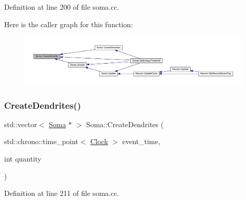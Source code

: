 Definition at line 200 of file soma.\+cc.

Here is the caller graph for this function\+:
\nopagebreak
\begin{figure}[H]
\begin{center}
\leavevmode
\includegraphics[width=350pt]{class_soma_a0fab0c7cf54c2b7d36e90edcd3e21a16_icgraph}
\end{center}
\end{figure}
\mbox{\label{class_soma_a68dc02eff2912ad045900ab1879f020e}} 
\subsubsection{\texorpdfstring{Create\+Dendrites()}{CreateDendrites()}}
{\footnotesize\ttfamily std\+::vector$<$ \hyperlink{class_soma}{Soma} $\ast$ $>$ Soma\+::\+Create\+Dendrites (\begin{DoxyParamCaption}\item[{std\+::chrono\+::time\+\_\+point$<$ \hyperlink{universe_8h_a0ef8d951d1ca5ab3cfaf7ab4c7a6fd80}{Clock} $>$}]{event\+\_\+time,  }\item[{int}]{quantity }\end{DoxyParamCaption})}



Definition at line 211 of file soma.\+cc.

